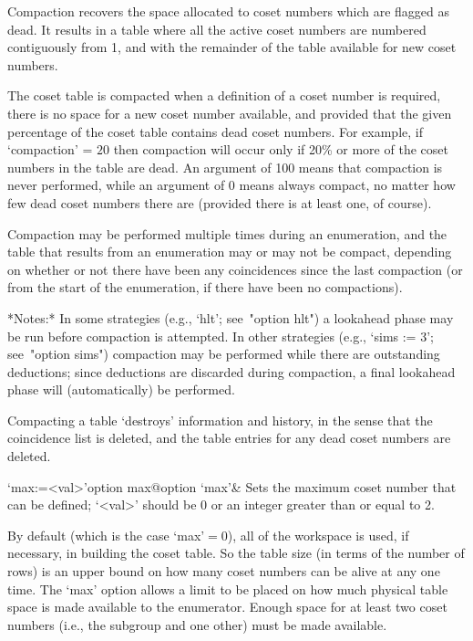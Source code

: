 Compaction recovers the space allocated to  coset  numbers  which  are
flagged as dead. It results in a table  where  all  the  active  coset
numbers are numbered contiguously from 1, and with  the  remainder  of
the table available for new coset numbers.

The coset table is compacted when a definition of a  coset  number  is
required, there is no space for a  new  coset  number  available,  and
provided that the given percentage of the coset  table  contains  dead
coset numbers. For example, if `compaction'  =  $20$  then  compaction
will occur only if 20\% or more of the coset numbers in the table  are
dead. An argument of 100 means that  compaction  is  never  performed,
while an argument of 0 means always compact, no matter  how  few  dead
coset numbers there are (provided there is at least one, of course).

Compaction may be performed  multiple times during an enumeration, and
the table that results from an  enumeration may or may not be compact,
depending on whether or not there have been any coincidences since the
last compaction (or  from the start of the  enumeration, if there have
been no compactions).

*Notes:*
In some strategies (e.g., `hlt'; see~"option hlt") a  lookahead  phase
may be run before compaction is attempted. In other strategies  (e.g.,
`sims := 3'; see~"option sims")  compaction  may  be  performed  while
there are  outstanding  deductions;  since  deductions  are  discarded
during compaction, a final lookahead  phase  will  (automatically)  be
performed.

Compacting a table \lq{}destroys'  information  and  history,  in  the
sense that the coincidence list is deleted, and the table entries  for
any dead coset numbers are deleted.

\>`max:=<val>'{option max}@{option `max'}&
Sets the maximum coset number that can be defined;
`<val>' should be $0$ or an integer greater than or equal to 2.

By default (which is the case `max'${}=0$), all of  the  workspace  is
used, if necessary, in building the coset table. So the table size (in
terms of the number of rows) is an  upper  bound  on  how  many  coset
numbers can be alive at any one time. The `max' option allows a  limit
to be placed on how much physical table space is made available to the
enumerator. Enough space for at least two  coset  numbers  (i.e.,  the
subgroup and one other) must be made available.

